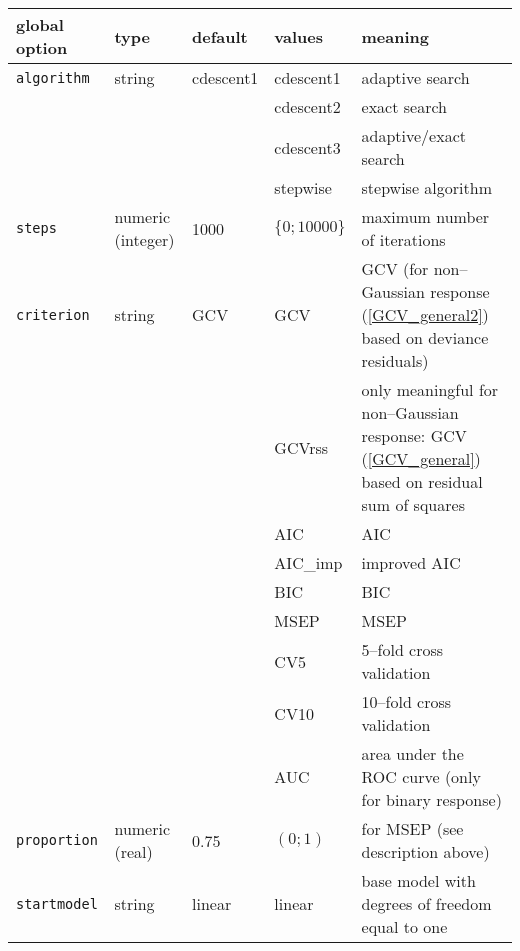 \begin{table}[ht] \footnotesize
\begin{center}
\begin{tabular}{|p{2.5cm}|p{1.5cm}|p{1.5cm}|p{2.5cm}|p{6cm}|}
\hline
{\bf global option} & {\bf type} & {\bf default} & {\bf values} & {\bf meaning} \\
\hline \hline
{\tt algorithm}  & string  & cdescent1 & cdescent1 & adaptive search \\
                 &         &           & cdescent2 & exact search \\
                 &         &           & cdescent3 & adaptive/exact search \\
                 &         &           & stepwise  & stepwise algorithm \\
\hline
{\tt steps}      & numeric \newline (integer) & 1000 & $\{0;10000\}$ & maximum number of iterations \\
\hline
{\tt criterion}  & string  & GCV       & GCV      & GCV (for non--Gaussian response (\ref{GCV_general2})
                                                      based on deviance residuals)\\
                 &         &           & GCVrss   & only meaningful for non--Gaussian response:
                                                    GCV (\ref{GCV_general}) based on residual sum of squares \\
                 &         &           & AIC      & AIC \\
                 &         &           & AIC\_imp & improved AIC \\
                 &         &           & BIC      & BIC \\
                 &         &           & MSEP     & MSEP \\
                 &         &           & CV5      & 5--fold cross validation \\
                 &         &           & CV10     & 10--fold cross validation \\
                 &         &           & AUC      & area under the ROC curve \newline
                                                    (only for binary response) \\
\hline
{\tt proportion} & numeric \newline (real)    & 0.75 & $(0;1)$ & for MSEP (see description above) \\
\hline
{\tt startmodel} & string  & linear    & linear      & base model with degrees of freedom equal to one \\

\end{tabular}
\end{center}
\end{table}
